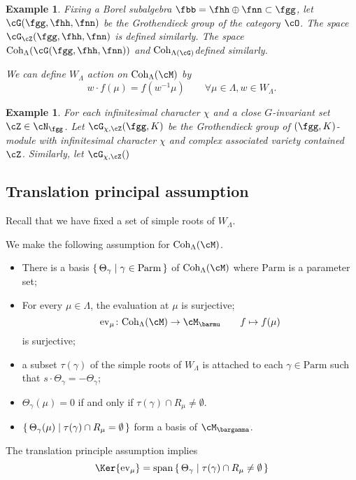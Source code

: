 \documentclass[12pt,a4paper]{amsart}
\numberwithin{equation}{section}
\newtheorem{eg}[thm]{Example}
\theoremstyle{remark}
\DeclareMathOperator{\sspan}{span}
\def\Wlam{W_{[\lambda]}}
\def\WLam{W_{\Lambda}}
\def\Coh{\mathrm{Coh}}
\def\ev#1{{\mathrm{ev}_{#1}}}
\begin{document}
\begin{eg}
  Fixing a Borel subalgebra $\fbb = \fhh\oplus \fnn \subset \fgg$, let
  $\cG(\fgg,\fhh,\fnn)$ be the Grothendieck group of the category $\cO$.
  The space $\cG_{\cZ}(\fgg,\fhh,\fnn)$ is defined similarly.
  The
  space $\Coh_\Lambda(\cG(\fgg,\fhh,\fnn))$ and $\Coh_{\Lambda(\cG)}$defined
  similarly.

We can define $W_{\Lambda}$ action on $\Coh_\Lambda(\cM)$ by
\[
   w\cdot f(\mu) =  f(w^{-1} \mu) \qquad \forall \mu\in \Lambda, w\in \WLam.
\]
\end{eg}

\begin{eg}
For each infinitesimal character $\chi$ and
a close $G$-invariant set $\cZ\in \cN_{\fgg}$.
Let $\Grt_{\chi,\cZ}(\fgg,K)$ be the Grothendieck group of $(\fgg,K)$-module
with infinitesimal character $\chi$ and complex associated variety contained
$\cZ$.
Similarly, let $\Grt_{\chi,\cZ}()$
\end{eg}


\def\Parm{\mathrm{Parm}}
\def\cof{\Theta}
\subsection*{Translation principal assumption}
Recall that we have fixed a set of simple roots of $W_\Lambda$.

We make the following assumption for $\Coh_\Lambda(\cM)$.
\begin{itemize}
\item There is a basis $\set{\cof_\gamma|\gamma\in \Parm}$ of
$\Coh_\Lambda(\cM)$ where $\Parm$ is a parameter set;
\item For every $\mu\in \Lambda$, the evaluation at $\mu$ is surjective;
  \[
    \ev{\mu}\colon \Coh_\Lambda(\cM)\rightarrow \cM_{\barmu} \qquad f\mapsto f(\mu)
  \]
  is surjective;
\item a subset $\tau(\gamma)$ of the simple roots of $W_\Lambda$ is attached
to each $\gamma\in \Parm$ such that $s\cdot \cof_\gamma = - \cof_\gamma$;
\item $\cof_\gamma(\mu) =0$ if and only if $\tau(\gamma)\cap R_\mu \neq \emptyset$.
\item $\set{\cof_\gamma(\mu)| \tau(\gamma)\cap R_\mu = \emptyset}$ form a basis of
$\cM_{\bargamma}$.
\end{itemize}

The translation principle assumption implies
\begin{equation}\label{eq:kevmu}
  \Ker\ev{\mu} = \sspan\set{{\cof}_{\gamma}|\tau(\gamma)\cap R_\mu \neq \emptyset } %
\end{equation}
\end{document}
